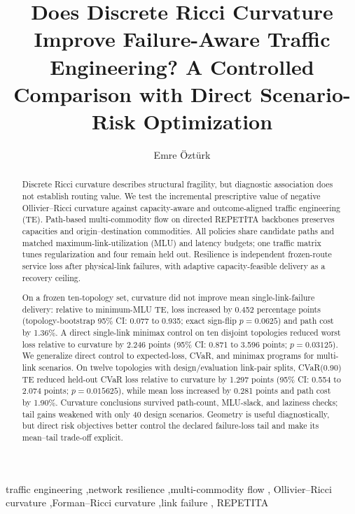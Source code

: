 \documentclass[preprint,12pt]{elsarticle}
\begin{document}
\begin{frontmatter}

\title{Does Discrete Ricci Curvature Improve Failure-Aware Traffic
Engineering? A Controlled Comparison with Direct Scenario-Risk Optimization}

\author{Emre \"Ozt\"urk}

\begin{abstract}
Discrete Ricci curvature describes structural fragility, but diagnostic
association does not establish routing value. We test the
incremental prescriptive value of negative Ollivier--Ricci curvature against
capacity-aware and outcome-aligned traffic engineering (TE). Path-based
multi-commodity flow on directed REPETITA backbones preserves capacities and
origin--destination commodities. All policies share candidate paths and
matched maximum-link-utilization (MLU) and latency budgets; one traffic matrix
tunes regularization and four remain held out. Resilience is independent
frozen-route service loss after physical-link failures, with adaptive
capacity-feasible delivery as a recovery ceiling.

On a frozen ten-topology set, curvature did not improve mean
single-link-failure delivery: relative to minimum-MLU TE, loss increased by
0.452 percentage points (topology-bootstrap 95\% CI: 0.077 to 0.935; exact
sign-flip $p=0.0625$) and path cost by 1.36\%. A direct single-link minimax
control on ten disjoint topologies reduced
worst loss relative to curvature by 2.246 points (95\% CI: 0.871 to 3.596
points; $p=0.03125$). We generalize direct control to
expected-loss, CVaR, and minimax programs for multi-link scenarios. On twelve
topologies with design/evaluation link-pair splits, CVaR(0.90) TE
reduced held-out CVaR loss relative to curvature by 1.297 points (95\% CI:
0.554 to 2.074 points; $p=0.015625$), while mean loss increased
by 0.281 points and path cost by 1.90\%. Curvature conclusions survived
path-count, MLU-slack, and laziness checks; tail gains weakened with only 40
design scenarios. Geometry is useful diagnostically,
but direct risk objectives better control the declared failure-loss tail and
make its mean--tail trade-off explicit.
\end{abstract}

\begin{keyword}
traffic engineering \sep network resilience \sep multi-commodity flow \sep
Ollivier--Ricci curvature \sep Forman--Ricci curvature \sep link failure \sep
REPETITA
\end{keyword}

\end{frontmatter}
\end{document}
